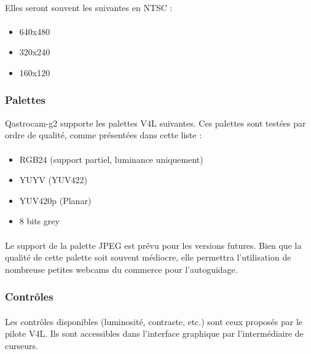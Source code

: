 \documentclass[11pt,a4paper]{book}
\begin{document}
\paragraph*{}
Elles seront souvent les suivantes en NTSC :

\paragraph*{}
\begin{itemize}
\item 640x480
\item 320x240
\item 160x120
\end{itemize}

\subsubsection{Palettes}

Qastrocam-g2 supporte les palettes V4L suivantes. Ces palettes sont test\'ees par ordre de qualit\'e,
comme pr\'esent\'ees dans cette liste :

\paragraph*{}
\begin{itemize}
\item RGB24 (support partiel, luminance uniquement)
\item YUYV (YUV422)
\item YUV420p (Planar)
\item 8 bits grey
\end{itemize}

\paragraph*{}
Le support de la palette JPEG est pr\'evu pour les versions futures. Bien que la qualit\'e
de cette palette soit souvent m\'ediocre, elle permettra l'utilisation de nombreuse petites
webcams du commerce pour l'autoguidage.

\subsubsection{Contr\^oles}

\paragraph*{}
Les contr\^oles disponibles (luminosit\'e, contraste, etc.) sont ceux propos\'es par le pilote
V4L. Ils sont accessibles dans l'interface graphique par l'interm\'ediaire de curseurs.
\end{document}
